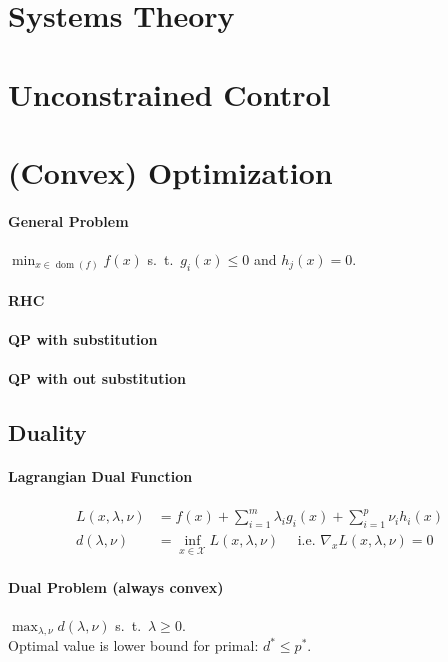 \documentclass[landscape,a4paper,8pt]{scrartcl}
\newcommand{\mc}[1]{\mathcal{#1}}
\DeclareMathOperator\dom{dom}
\begin{document}

\begin{multicols*}{3}
\section{Systems Theory}
\section{Unconstrained Control}

\section{(Convex) Optimization}

\paragraph{General Problem}
$\min_{x \in \dom(f)} f(x)$ s.\ t.\ $g_i(x) \leq 0$ and $h_j(x) = 0.$

\paragraph{RHC}
\paragraph{QP with substitution}
\paragraph{QP with out substitution}

\subsection{Duality}
\paragraph{Lagrangian Dual Function}
\begin{align*}
	L(x,\lambda,\nu) & = f(x) + \sum_{i=1}^{m}\lambda_i g_i(x) + \sum_{i=1}^{p}\nu_i h_i(x) \\
	d(\lambda,\nu) & = \inf_{x \in \mc{X}} L(x,\lambda,\nu) \quad \text{ i.e. } \nabla_x L(x, \lambda, \nu) = 0
\end{align*}
\paragraph{Dual Problem (always convex)} 
$\max_{\lambda,\nu} d(\lambda,\nu)$ s.\ t.\ $\lambda \geq 0$. \\
Optimal value is lower bound for primal: $d^* \leq p^*$.


\end{multicols*}
\end{document}
